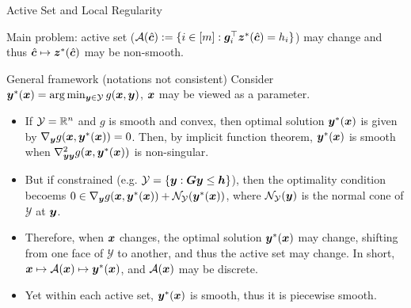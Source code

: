 \documentclass[10pt,aspectratio=169,xcolor=dvipsnames]{beamer}
\begin{document}
\begin{frame}{Active Set and Local Regularity}

    Main problem: active set ($\mathcal{A}(\hat{{\bm{c}}}):=\{i \in [m] : {\bm{g}}_i^\top {\bm{z}}^*(\hat{{\bm{c}}}) = {h}_i\}$) may change and thus $\hat{{\bm{c}}} \mapsto {\bm{z}}^*(\hat{{\bm{c}}})$ may be non-smooth.
    \begin{block}{General framework (notations not consistent)}
       Consider ${\bm{y}}^*({\bm{x}}) = \arg\min_{{\bm{y}} \in \mathcal{Y}} g({\bm{x}},{\bm{y}})$, ${\bm{x}}$ may be viewed as a parameter.
       \begin{itemize}
            \item If $\mathcal{Y} = \mathbb{R}^n$ and $g$ is smooth and convex, then optimal solution ${\bm{y}}^*({\bm{x}})$ is given by $\nabla_{{\bm{y}}} g({\bm{x}},{\bm{y}}^*({\bm{x}})) = 0$. Then, by implicit function theorem, ${\bm{y}}^*({\bm{x}})$ is smooth when $\nabla^2_{{\bm{y}}{\bm{y}}} g({\bm{x}},{\bm{y}}^*({\bm{x}}))$ is non-singular.
            \item But if constrained (e.g. $\mathcal{Y} = \{{\bm{y}} : {\bm{G}}{\bm{y}} \leq {\bm{h}}\}$), then the optimality condition becoems $0 \in \nabla_{{\bm{y}}} g({\bm{x}},{\bm{y}}^*({\bm{x}})) + \mathcal{N}_{\mathcal{Y}}({\bm{y}}^*({\bm{x}}))$, where $\mathcal{N}_{\mathcal{Y}}({\bm{y}})$ is the normal cone of $\mathcal{Y}$ at ${\bm{y}}$.
            \item Therefore, when ${\bm{x}}$ changes, the optimal solution ${\bm{y}}^*({\bm{x}})$ may change, shifting from one face of $\mathcal{Y}$ to another, and thus the active set may change. In short, ${\bm{x}} \mapsto \mathcal{A}({\bm{x}}) \mapsto {\bm{y}}^*({\bm{x}})$, and $\mathcal{A}({\bm{x}})$ may be discrete.
            \item Yet within each active set, ${\bm{y}}^*({\bm{x}})$ is smooth, thus it is piecewise smooth.
       \end{itemize}


    \end{block}


\end{frame}
\end{document}

